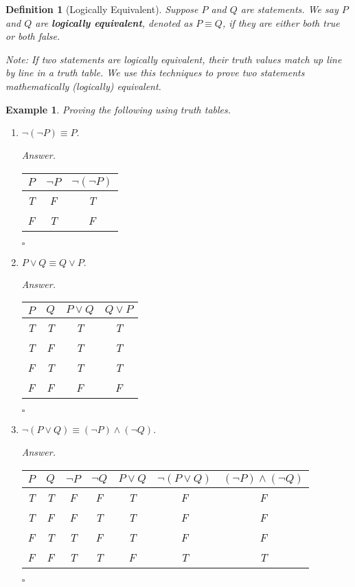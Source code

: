 \documentclass[12pt,a4paper]{article}
\newtheorem{df}{Definition}[subsection]
\newtheorem{eg}{Example}[subsection]
\newenvironment*{ans}{\par{\textit{Answer. }}}{\hfill{$\square$}\par}
\begin{document}
\begin{df}[Logically Equivalent]
	Suppose $P$ and $Q$ are statements. We say $P$ and $Q$ are \textbf{logically equivalent}, denoted as $P\equiv Q$, if they are either both true or both false.
	
	Note: If two statements are logically equivalent, their truth values match up line by line in a truth table. We use this techniques to prove two statements mathematically (logically) equivalent. 
\end{df}
\begin{eg}
	Proving the following using truth tables.
	\begin{enumerate}
		\item $\neg(\neg P)\equiv P.$
		\begin{ans}\begin{center}\begin{tabular}{c|c|c}
		$P$&$\neg P$&$\neg(\neg P)$\\
		\hline
		T&F&T\\
		F&T&F
		\end{tabular}\end{center}\end{ans}
		\item $P\vee Q\equiv Q\vee P.$
		\begin{ans}\begin{center}\begin{tabular}{c|c|c|c}
			$P$&$Q$&$P\vee Q$&$Q\vee P$\\
			\hline
			T&T&T&T\\
			T&F&T&T\\
			F&T&T&T\\
			F&F&F&F
		\end{tabular}\end{center}\end{ans}
		\item $\neg(P\vee Q)\equiv(\neg P)\wedge(\neg Q).$
		\begin{ans}\begin{center}\begin{tabular}{c|c|c|c|c|c|c}
			$P$&$Q$&$\neg P$&$\neg Q$&$P\vee Q$&$\neg(P\vee Q)$&$(\neg P)\wedge(\neg Q)$\\
			\hline
			T&T&F&F&T&F&F\\
			T&F&F&T&T&F&F\\
			F&T&T&F&T&F&F\\
			F&F&T&T&F&T&T
		\end{tabular}\end{center}\end{ans}

\end{enumerate}
\end{eg}
\end{document}
